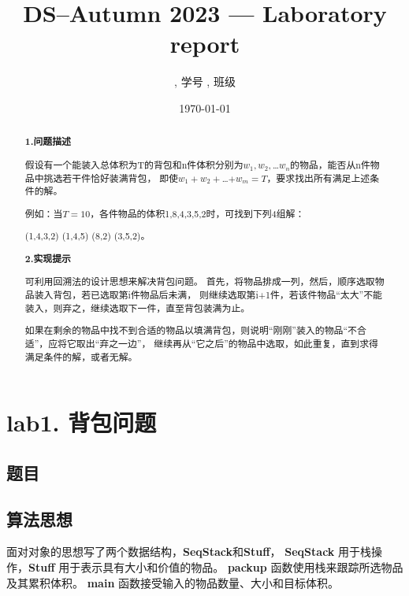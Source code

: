 \documentclass[UTF8]{ctexart}
\title{DS--Autumn 2023 --- Laboratory report} %
\author{\Name, 学号 \SID, 班级 \Class} %
\date{\today} %
\begin{document}
\maketitle


\section*{lab1. 背包问题}
\subsection*{题目}
\begin{abstract}
    \textbf{1.问题描述}


    假设有一个能装入总体积为T的背包和n件体积分别为$w_1,w_2,$…$w_n$的物品，能否从n件物品中挑选若干件恰好装满背包，
    即使$w_1+w_2+$…$+w_m=T$，要求找出所有满足上述条件的解。 
   
    例如：当$T=10$，各件物品的体积{1,8,4,3,5,2}时，可找到下列4组解：

    (1,4,3,2)     (1,4,5)     (8,2)     (3,5,2)。

    \textbf{2.实现提示}


    可利用回溯法的设计思想来解决背包问题。
    首先，将物品排成一列，然后，顺序选取物品装入背包，若已选取第i件物品后未满，
    则继续选取第i+1件，若该件物品“太大”不能装入，则弃之，继续选取下一件，直至背包装满为止。

    如果在剩余的物品中找不到合适的物品以填满背包，则说明“刚刚”装入的物品“不合适”，应将它取出“弃之一边”，
    继续再从“它之后”的物品中选取，如此重复，直到求得满足条件的解，或者无解。

\end{abstract}

\subsection*{算法思想}


    面对对象的思想写了两个数据结构，\textbf{SeqStack}和\textbf{Stuff}，
    \textbf{SeqStack} 用于栈操作，\textbf{Stuff} 用于表示具有大小和价值的物品。
    \textbf{packup} 函数使用栈来跟踪所选物品及其累积体积。
    \textbf{main} 函数接受输入的物品数量、大小和目标体积。
    
\end{document}
